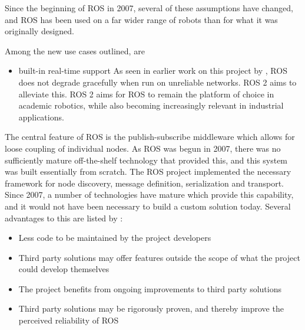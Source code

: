 \documentclass[\rootfolder/main.tex]{subfiles}
\begin{document}
Since the beginning of ROS in 2007, several of these assumptions have changed, and ROS has been used on a far wider range of robots than for what it was originally designed.

Among the new use cases outlined, are

\begin{itemize}
        Currently, there is no standard way to control more than a single robot using ROS.
        ROS has a single-master architecture, and multi-robot support does not elegantly integrate into this design.
        ROS is not designed to run on microcontrollers. Therefore, nodes must interact with these through a device driver.
        ROS 2 is designed so that these controllers can be implemented as nodes, and thereby participate directly in the control system as first-class citizens.
    \item{built-in real-time support}
        As seen in earlier work on this project by \cite{Waløen2017}, ROS does not degrade gracefully when run on unreliable networks.
        ROS 2 aims to alleviate this.
        ROS 2 aims for ROS to remain the platform of choice in academic robotics, while also becoming increasingly relevant in industrial applications.
\end{itemize}

The central feature of ROS is the publish-subscribe middleware which allows for loose coupling of individual nodes.
As ROS was begun in 2007, there was no sufficiently mature off-the-shelf technology that provided this, and this system was built essentially from scratch.
The ROS project implemented the necessary framework for node discovery, message definition, serialization and transport.
Since 2007, a number of technologies have mature which provide this capability, and it would not have been necessary to build a custom solution today.
Several advantages to this are listed by \cite{Gerkey2017}:

\begin{itemize}
    \item Less code to be maintained by the project developers
    \item Third party solutions may offer features outside the scope of what the project could develop themselves
    \item The project benefits from ongoing improvements to third party solutions
    \item Third party solutions may be rigorously proven, and thereby improve the perceived reliability of ROS
\end{itemize}
\end{document}
